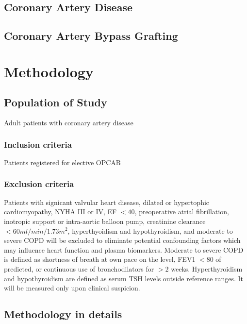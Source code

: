 \documentclass[14pt,a4paper,onecolumn]{article}
\begin{document}
\subsection{Coronary Artery Disease}
\subsection{Coronary Artery Bypass Grafting}

\section{Methodology}

\subsection{Population of Study}

Adult patients with coronary artery disease

\subsubsection{Inclusion criteria}

Patients registered for elective OPCAB

\subsubsection{Exclusion criteria}

Patients with signicant valvular heart disease, dilated or hypertophic cardiomyopathy, NYHA III or IV, EF $< 40$, preoperative atrial fibrillation, inotropic support or intra-aortic balloon pump, creatinine clearance $< 60 ml/min/1.73 m^2$, hyperthyoidism and hypothyroidism, and moderate to severe COPD will be excluded to eliminate potential confounding factors which may influence heart function and plasma biomarkers.  Moderate to severe COPD is defined as shortness of breath at own pace on the level, FEV1 $< 80$ of predicted, or continuous use of bronchodilators for $> 2$ weeks.  Hyperthyroidism and hypothyroidism are defined as serum TSH levels outside reference ranges.  It will be measured only upon clinical suspicion.

\subsection{Methodology in details}
\end{document}
